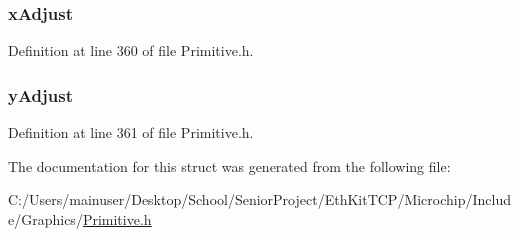 \subsubsection[{x\+Adjust}]{ x\+Adjust}\label{struct_g_l_y_p_h___e_n_t_r_y___e_x_t_e_n_d_e_d_a6d1e1af82a14cbb07a9d1dd2400f643f}


Definition at line 360 of file Primitive.\+h.

\hypertarget{struct_g_l_y_p_h___e_n_t_r_y___e_x_t_e_n_d_e_d_a647fa89d17c79155806497a02e5812f8}{}
\subsubsection[{y\+Adjust}]{ y\+Adjust}\label{struct_g_l_y_p_h___e_n_t_r_y___e_x_t_e_n_d_e_d_a647fa89d17c79155806497a02e5812f8}


Definition at line 361 of file Primitive.\+h.



The documentation for this struct was generated from the following file\+:\begin{DoxyCompactItemize}
\item 
C\+:/\+Users/mainuser/\+Desktop/\+School/\+Senior\+Project/\+Eth\+Kit\+T\+C\+P/\+Microchip/\+Include/\+Graphics/\hyperlink{_primitive_8h}{Primitive.\+h}\end{DoxyCompactItemize}

